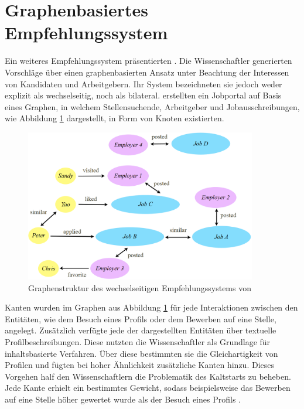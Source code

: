 \section{Graphenbasiertes Empfehlungssystem}
\label{ch:verwandteArbeiten:nichtAufDemPEFitBasierendeBilateraleSysteme:lu:2013}
Ein weiteres Empfehlungssystem präsentierten \textcite[S. 1ff.]{lu:2013}. Die Wissenschaftler generierten Vorschläge über einen graphenbasierten Ansatz unter Beachtung der Interessen von Kandidaten und Arbeitgebern. Ihr System bezeichneten sie jedoch weder explizit als wechselseitig, noch als bilateral. \textcite[S. 1ff.]{lu:2013} erstellten ein Jobportal auf Basis eines Graphen, in welchem Stellensuchende, Arbeitgeber und Jobausschreibungen, wie Abbildung \ref{fig:verwandteArbeiten:nichtAufDemPEFitBasierendeBilateraleSysteme:lu:2013:abb1} dargestellt, in Form von Knoten existierten.

\begin{figure}[h]
	\centering
	\includegraphics[width=0.9\textwidth]{gfx/lu-graph.png}
	\caption{Graphenstruktur des wechselseitigen Empfehlungssystems von \textcite[S. 2]{lu:2013}}
	\label{fig:verwandteArbeiten:nichtAufDemPEFitBasierendeBilateraleSysteme:lu:2013:abb1}
\end{figure}

Kanten wurden im Graphen aus Abbildung \ref{fig:verwandteArbeiten:nichtAufDemPEFitBasierendeBilateraleSysteme:lu:2013:abb1} für jede Interaktionen zwischen den Entitäten, wie dem Besuch eines Profils oder dem Bewerben auf eine Stelle, angelegt. Zusätzlich verfügte jede der dargestellten Entitäten über textuelle Profilbeschreibungen. Diese nutzten die Wissenschaftler als Grundlage für inhaltsbasierte Verfahren. Über diese bestimmten sie die Gleichartigkeit von Profilen und fügten bei hoher Ähnlichkeit zusätzliche Kanten hinzu. Dieses Vorgehen half den Wissenschaftlern die Problematik des Kaltstarts zu beheben. Jede Kante erhielt ein bestimmtes Gewicht, sodass beispielsweise das Bewerben auf eine Stelle höher gewertet wurde als der Besuch eines Profils \cite[S. 1ff.]{lu:2013}.

